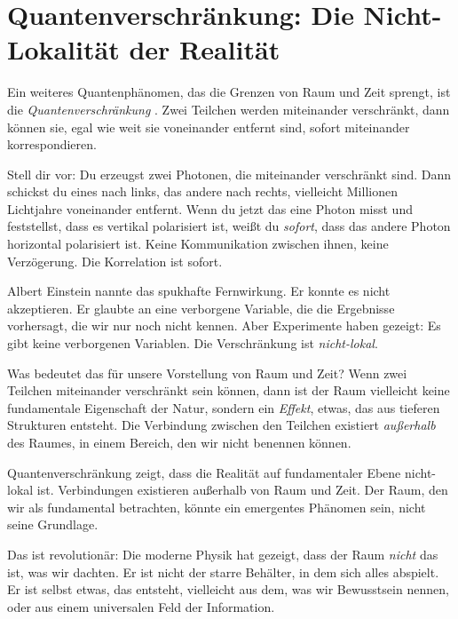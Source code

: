 \section{Quantenverschränkung: Die Nicht-Lokalität der Realität}

Ein weiteres Quantenphänomen, das die Grenzen von Raum und Zeit sprengt, ist die \emph{Quantenverschränkung} \cite{Bell1964}. Zwei Teilchen werden miteinander \glqq verschränkt\grqq{}, dann können sie, egal wie weit sie voneinander entfernt sind, sofort miteinander korrespondieren.

Stell dir vor: Du erzeugst zwei Photonen, die miteinander verschränkt sind. Dann schickst du eines nach links, das andere nach rechts, vielleicht Millionen Lichtjahre voneinander entfernt. Wenn du jetzt das eine Photon misst und feststellst, dass es vertikal polarisiert ist, weißt du \emph{sofort}, dass das andere Photon horizontal polarisiert ist. Keine Kommunikation zwischen ihnen, keine Verzögerung. Die Korrelation ist sofort.

Albert Einstein nannte das \glqq spukhafte Fernwirkung\grqq{}. Er konnte es nicht akzeptieren. Er glaubte an eine \glqq verborgene Variable\grqq{}, die die Ergebnisse vorhersagt, die wir nur noch nicht kennen. Aber Experimente haben gezeigt: Es gibt keine verborgenen Variablen. Die Verschränkung ist \emph{nicht-lokal}.

Was bedeutet das für unsere Vorstellung von Raum und Zeit? Wenn zwei Teilchen miteinander verschränkt sein können, dann ist der Raum vielleicht keine fundamentale Eigenschaft der Natur, sondern ein \emph{Effekt}, etwas, das aus tieferen Strukturen entsteht. Die Verbindung zwischen den Teilchen existiert \emph{außerhalb} des Raumes, in einem Bereich, den wir nicht benennen können.

\begin{satz}
	Quantenverschränkung zeigt, dass die Realität auf fundamentaler Ebene nicht-lokal ist. Verbindungen existieren außerhalb von Raum und Zeit. Der Raum, den wir als fundamental betrachten, könnte ein emergentes Phänomen sein, nicht seine Grundlage.
\end{satz}

Das ist revolutionär: Die moderne Physik hat gezeigt, dass der Raum \emph{nicht} das ist, was wir dachten. Er ist nicht der starre Behälter, in dem sich alles abspielt. Er ist selbst etwas, das entsteht, vielleicht aus dem, was wir \glqq Bewusstsein\grqq{} nennen, oder aus einem universalen Feld der Information.

